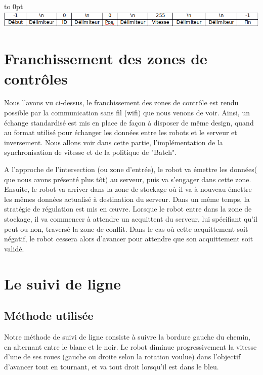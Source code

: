 \documentclass[french,a4paper,12pt]{report}
\begin{document}
\hfill\hbox to 0pt{\hss\includegraphics[width=15cm]{val2.png}\hss}\hfill\null\newline

\chapter{Franchissement des zones de contrôles}
Nous l'avons vu ci-dessus, le franchissement des zones de contrôle est rendu possible par la communication sans fil (wifi) que nous venons de voir. Ainsi, un échange standardisé est mis en place de façon à disposer de même design, quand au format utilisé pour échanger les données entre les robots et le serveur et inversement.
Nous allons voir dans cette partie, l'implémentation de la synchronisation de vitesse et de la politique de "Batch".


A l'approche de l'intersection (ou zone d'entrée), le robot va émettre les données( que nous avons présenté plus tôt) au serveur, puis va s'engager dans cette zone.
Ensuite, le robot va arriver dans la zone de stockage où il va à nouveau émettre les mêmes données actualisé à destination du serveur. Dans un même temps, la stratégie de régulation est mis en œuvre. Lorsque le robot entre dans la zone de stockage, il va commencer à attendre un acquittent du serveur, lui spécifiant qu'il peut ou non, traversé la zone de conflit. Dans le cas où cette acquittement soit négatif, le robot cessera alors d'avancer pour attendre que son acquittement soit validé.


\chapter{Le suivi de ligne} %

\section{Méthode utilisée}
Notre méthode de suivi de ligne consiste à suivre la bordure gauche du chemin, en alternant entre le blanc et le noir. Le robot diminue progressivement la vitesse d’une de ses roues (gauche ou droite selon la rotation voulue) dans l’objectif d’avancer tout en tournant, et va tout droit lorsqu’il est dans le bleu.
\end{document}
